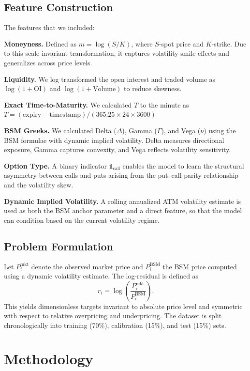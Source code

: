 \documentclass[runningheads]{llncs}
\newcommand{\rev}[1]{{\color{blue}#1}}
\begin{document}
\subsection{Feature Construction}
\rev{The features that we included:}

\textbf{Moneyness.} Defined as $m = \log(S/K)$, where $S$-spot price and $K$-strike. Due to this scale-invariant transformation, it captures volatility smile effects and generalizes across price levels.

\textbf{Liquidity.} We log transformed the open interest and traded volume as $\log(1+\text{OI})$ and $\log(1+\text{Volume})$ to reduce skewness.

\rev{\textbf{Exact Time-to-Maturity.} We calculated $T$ to the minute as $T = (\text{expiry} - \text{timestamp}) / (365.25 \times 24 \times 3600)$}

\rev{\textbf{BSM Greeks.} We calculated Delta ($\Delta$), Gamma ($\Gamma$), and Vega ($\nu$) using the BSM formulae with dynamic implied volatility. Delta measures directional exposure, Gamma captures convexity, and Vega reflects volatility sensitivity.}

\rev{\textbf{Option Type.} A binary indicator $\mathbb{1}_{\text{call}}$ enables the model to learn the structural asymmetry between calls and puts arising from the put--call parity relationship and the volatility skew.}

\rev{\textbf{Dynamic Implied Volatility.} A rolling annualized ATM volatility estimate is used as both the BSM anchor parameter and a direct feature, so that the model can condition based on the current volatility regime.}

\subsection{Problem Formulation}

Let $P^{\text{mkt}}_i$ denote the observed market price and $P^{\text{BSM}}_i$ the BSM price computed using a dynamic volatility estimate. The log-residual is defined as
\begin{equation}
r_i = \log\left(\frac{P^{\text{mkt}}_i}{P^{\text{BSM}}_i}\right).
\end{equation}
This yields dimensionless targets invariant to absolute price level and symmetric with respect to relative overpricing and underpricing. The dataset is split chronologically into training (70\%), calibration (15\%), and test (15\%) sets.


\section{Methodology}
\end{document}
